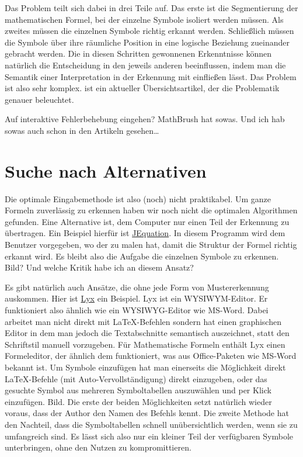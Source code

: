 Das Problem teilt sich dabei in drei Teile auf. Das erste ist die Segmentierung der mathematischen Formel, bei der einzelne Symbole isoliert werden müssen. Als zweites müssen die einzelnen Symbole richtig erkannt werden. Schließlich müssen die Symbole über ihre räumliche Position in eine logische Beziehung zueinander gebracht werden. Die in diesen Schritten gewonnenen Erkenntnisse können natürlich die Entscheidung in den jeweils anderen beeinflussen, indem man die Semantik einer Interpretation in der Erkennung mit einfließen lässt. Das Problem ist also sehr komplex. \cite{Tapia:2007p9160} ist ein aktueller Übersichtsartikel, der die Problematik genauer beleuchtet.

\TODO Auf interaktive Fehlerbehebung eingehen? MathBrush hat sowas. Und ich hab sowas auch schon in den Artikeln gesehen\dots

\section{Suche nach Alternativen}
\label{sec:alternativen}

Die optimale Eingabemethode ist also (noch) nicht praktikabel. Um ganze Formeln zuverlässig zu erkennen haben wir noch nicht die optimalen Algorithmen gefunden. Eine Alternative ist, dem Computer nur einen Teil der Erkennung zu übertragen. Ein Beispiel hierfür ist \href{http://jequation.sourceforge.net/}{JEquation}. In diesem Programm wird dem Benutzer vorgegeben, wo der zu malen hat, damit die Struktur der Formel richtig erkannt wird. Es bleibt also die Aufgabe die einzelnen Symbole zu erkennen. \TODO Bild? Und welche Kritik habe ich an diesem Ansatz?

Es gibt natürlich auch Ansätze, die ohne jede Form von Mustererkennung auskommen. Hier ist \href{http://lyx.org}{Lyx} ein Beispiel. Lyx ist ein \ac{WYSIWYM}-Editor. Er funktioniert also ähnlich wie ein \ac{WYSIWYG}-Editor wie MS-Word. Dabei arbeitet man nicht direkt mit \LaTeX-Befehlen sondern hat einen graphischen Editor in dem man jedoch die Textabschnitte semantisch auszeichnet, statt den Schriftstil manuell vorzugeben. Für Mathematische Formeln enthält Lyx einen Formeleditor, der ähnlich dem funktioniert, was aus Office-Paketen wie MS-Word bekannt ist. Um Symbole einzufügen hat man einerseits die Möglichkeit direkt \LaTeX-Befehle (mit Auto-Vervollständigung) direkt einzugeben, oder das gesuchte Symbol aus mehreren Symboltabellen auszuwählen und per Klick einzufügen. \TODO Bild. Die erste der beiden Möglichkeiten setzt natürlich wieder voraus, dass der Author den Namen des Befehls kennt. Die zweite Methode hat den Nachteil, dass die Symboltabellen schnell unübersichtlich werden, wenn sie zu umfangreich sind. Es lässt sich also nur ein kleiner Teil der verfügbaren Symbole unterbringen, ohne den Nutzen zu kompromittieren.

